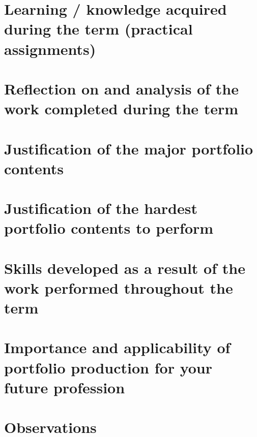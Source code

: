 \documentclass{report}
\begin{document}
\section{Learning / knowledge acquired during the term (practical assignments)}
\section{Reflection on and analysis of the work completed during the term}
\section{Justification of the major portfolio contents}
\section{Justification of the hardest portfolio contents to perform}
\section{Skills developed as a result of the work performed throughout the term}
\section{Importance and applicability of portfolio production for your future profession}
\section{Observations}
\end{document}
